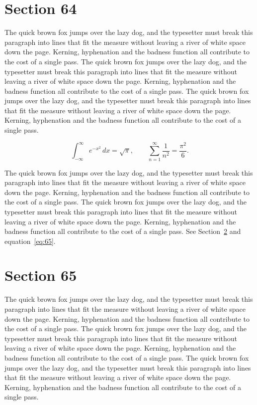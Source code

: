 \documentclass{article}
\begin{document}
\section{Section 64}
\label{sec:64}
The quick brown fox jumps over the lazy dog, and the typesetter must break this paragraph into lines that fit the measure without leaving a river of white space down the page. Kerning, hyphenation and the badness function all contribute to the cost of a single pass. The quick brown fox jumps over the lazy dog, and the typesetter must break this paragraph into lines that fit the measure without leaving a river of white space down the page. Kerning, hyphenation and the badness function all contribute to the cost of a single pass. The quick brown fox jumps over the lazy dog, and the typesetter must break this paragraph into lines that fit the measure without leaving a river of white space down the page. Kerning, hyphenation and the badness function all contribute to the cost of a single pass. 

\begin{equation}\label{eq:64}
\int_{-\infty}^{\infty} e^{-x^{2}}\,dx = \sqrt{\pi}, \qquad
\sum_{n=1}^{\infty} \frac{1}{n^{2}} = \frac{\pi^{2}}{6}.
\end{equation}

The quick brown fox jumps over the lazy dog, and the typesetter must break this paragraph into lines that fit the measure without leaving a river of white space down the page. Kerning, hyphenation and the badness function all contribute to the cost of a single pass. The quick brown fox jumps over the lazy dog, and the typesetter must break this paragraph into lines that fit the measure without leaving a river of white space down the page. Kerning, hyphenation and the badness function all contribute to the cost of a single pass. 
See Section~\ref{sec:65} and equation~\eqref{eq:65}.
\section{Section 65}
\label{sec:65}
The quick brown fox jumps over the lazy dog, and the typesetter must break this paragraph into lines that fit the measure without leaving a river of white space down the page. Kerning, hyphenation and the badness function all contribute to the cost of a single pass. The quick brown fox jumps over the lazy dog, and the typesetter must break this paragraph into lines that fit the measure without leaving a river of white space down the page. Kerning, hyphenation and the badness function all contribute to the cost of a single pass. The quick brown fox jumps over the lazy dog, and the typesetter must break this paragraph into lines that fit the measure without leaving a river of white space down the page. Kerning, hyphenation and the badness function all contribute to the cost of a single pass. 
\end{document}
